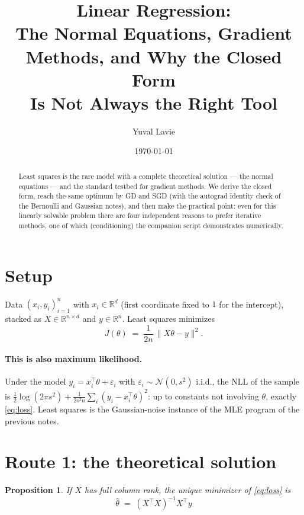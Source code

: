 \documentclass[11pt]{article}
\title{Linear Regression:\\
The Normal Equations, Gradient Methods, and Why the Closed Form\\
Is Not Always the Right Tool}
\author{Yuval Lavie}
\date{\today}
\newtheorem{proposition}{Proposition}
\begin{document}
\maketitle

\begin{abstract}
Least squares is the rare model with a complete theoretical solution ---
the normal equations --- and the standard testbed for gradient methods.
We derive the closed form, reach the same optimum by GD and SGD (with the
autograd identity check of the Bernoulli and Gaussian notes), and then
make the practical point: even for this linearly solvable problem there
are four independent reasons to prefer iterative methods, one of which
(conditioning) the companion script demonstrates numerically.
\end{abstract}

\section{Setup}

Data $(x_i, y_i)_{i=1}^n$ with $x_i \in \mathbb{R}^d$ (first coordinate
fixed to $1$ for the intercept), stacked as $X \in \mathbb{R}^{n\times d}$
and $y \in \mathbb{R}^n$. Least squares minimizes
\begin{equation}
  J(\theta) \;=\; \frac{1}{2n}\,\lVert X\theta - y \rVert^2 .
  \label{eq:loss}
\end{equation}

\paragraph{This is also maximum likelihood.} Under the model
$y_i = x_i^\top\theta + \varepsilon_i$ with
$\varepsilon_i \sim \mathcal{N}(0, s^2)$ i.i.d., the NLL of the sample is
$\tfrac12\log(2\pi s^2) + \tfrac{1}{2s^2 n}\sum_i (y_i - x_i^\top\theta)^2$:
up to constants not involving $\theta$, exactly \eqref{eq:loss}. Least
squares is the Gaussian-noise instance of the MLE program of the previous
notes.

\section{Route 1: the theoretical solution}

\begin{proposition}
If $X$ has full column rank, the unique minimizer of \eqref{eq:loss} is
\begin{equation}
  \boxed{\;\hat\theta \;=\; (X^\top X)^{-1} X^\top y\;}
  \label{eq:normaleq}
\end{equation}
\end{proposition}
\end{document}
